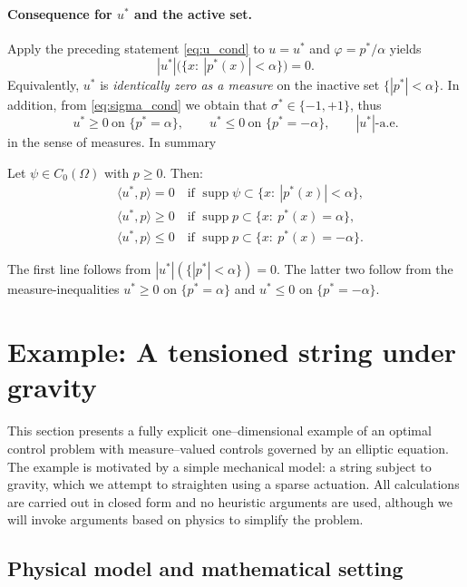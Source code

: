 \documentclass[11pt,a4paper]{article}
\begin{document}
\paragraph{Consequence for $u^*$ and the active set.}
Apply the preceding statement \ref{eq:u_cond} to $u=u^*$ and $\varphi=p^*/\alpha$ yields
\[
|u^*|\bigl(\{x:\ |p^*(x)|<\alpha\}\bigr)=0.
\]
Equivalently, $u^*$ is \emph{identically zero as a measure} on the inactive set
$\{ |p^*|<\alpha\}$.
In addition, from \ref{eq:sigma_cond} we obtain that $\sigma^*\in\{-1, +1\}$, thus
\[
u^* \ge 0 \ \text{on } \{p^*=\alpha\},
\qquad
u^* \le 0 \ \text{on } \{p^*=-\alpha\},
\qquad |u^*|\textrm{-a.e.}
\]
in the sense of measures. In summary

\begin{theorem}
Let $\psi \in C_0(\Omega)$ with $p \ge 0$. Then:
\begin{align*}
&\langle u^*,p\rangle=0
\quad\text{if }\operatorname{supp}\psi\subset\{x:\ |p^*(x)|<\alpha\},
\\
&\langle u^*,p\rangle\ge 0
\quad\text{if }\operatorname{supp}p\subset\{x:\ p^*(x)=\alpha\},
\\
&\langle u^*,p\rangle\le 0
\quad\text{if }\operatorname{supp}p\subset\{x:\ p^*(x)=-\alpha\}.
\end{align*}    
\end{theorem}

The first line follows from $|u^*|(\{|p^*|<\alpha\})=0$.
The latter two follow from the measure-inequalities $u^*\ge 0$ on $\{p^*=\alpha\}$
and $u^*\le 0$ on $\{p^*=-\alpha\}$.

\section{Example: A tensioned string under gravity}
\label{sec:example}

This section presents a fully explicit one--dimensional example of an optimal
control problem with measure--valued controls governed by an elliptic equation.
The example is motivated by a simple mechanical model: a string
subject to gravity, which we attempt to straighten using a sparse actuation.
All calculations are carried out in closed form and no heuristic arguments are
used, although we will invoke arguments based on physics to simplify the problem.


\subsection{Physical model and mathematical setting}
\end{document}
